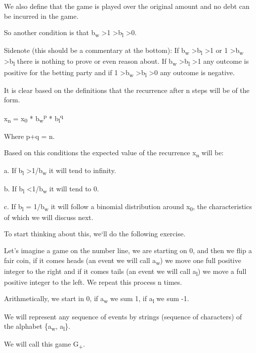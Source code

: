 \documentclass[12pt,reqno]{amsart}
\begin{document}
We also define that the game is played over the original amount and no debt can be incurred in the game.

So another condition is that b\textsubscript{w} \textgreater 1 \textgreater b\textsubscript{l} \textgreater 0.

Sidenote (this should be a commentary at the bottom): If b\textsubscript{w} \textgreater b\textsubscript{l} \textgreater 1 or 1 \textgreater b\textsubscript{w} \textgreater b\textsubscript{l} there is nothing to prove or even reason about. If b\textsubscript{w} \textgreater b\textsubscript{l} \textgreater 1 any outcome is positive for the betting party and if 1 \textgreater b\textsubscript{w} \textgreater b\textsubscript{l} \textgreater 0 any outcome is negative. 

It is clear based on the definitions that the recurrence after n steps will be of the form.

x\textsubscript{n} = x\textsubscript{0} * b\textsubscript{w}\textsuperscript{p} * b\textsubscript{l}\textsuperscript{q}

Where p+q = n.

Based on this conditions the expected value of the recurrence x\textsubscript{n} will be:

a. If b\textsubscript{l} \textgreater 1/b\textsubscript{w} it will tend to infinity.

b. If b\textsubscript{l} \textless 1/b\textsubscript{w} it will tend to 0.

c. If b\textsubscript{l} = 1/b\textsubscript{w} it will follow a binomial distribution around x\textsubscript{0}, the characteristics of which we will discuss next.

To start thinking about this, we`ll do the following exercise. 

Let's imagine a game on the number line, we are starting on 0, and then we flip a fair coin, if it comes heads (an event we will call a\textsubscript{w}) we move one full positive integer to the right and if it comes tails (an event we will call a\textsubscript{l}) we move a full positive integer to the left. We repeat this process n times.

Arithmetically, we start in 0, if a\textsubscript{w} we sum 1, if a\textsubscript{l} we sum -1.

We will represent any sequence of events by strings (sequence of characters) of the alphabet \{a\textsubscript{w}, a\textsubscript{l}\}. 

We will call this game G\textsubscript{+}.
\end{document}
